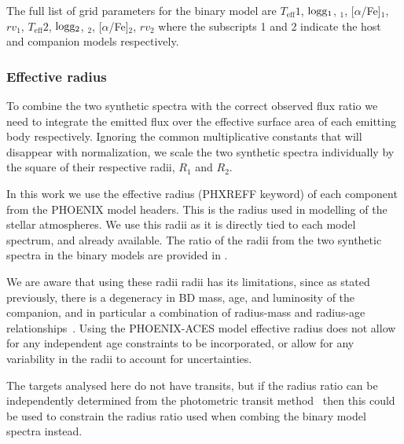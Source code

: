 {\rd{} The full list of grid parameters for the binary model are \(T_{\textrm{eff}}1\),  \(\rm logg_1\), \feh{}\(_1\), [\(\alpha\)/Fe]\(_1\), \({rv}_1\), \(T_{\textrm{eff}}2\), \(\rm logg_2\), \feh{}\(_2\), [\(\alpha\)/Fe]\(_2\), \({rv}_2\) where the subscripts 1 and 2 indicate the host and companion models respectively.}






\subsubsection{Effective radius}
\label{subsection-radius}

To combine the two synthetic spectra with the correct observed flux ratio we need to integrate the emitted flux over the effective surface area of each emitting body respectively. Ignoring the common multiplicative constants that will disappear with normalization, we scale the two synthetic spectra individually by the square of their respective radii, \(R_1\) and \(R_2\).

In this work we use the effective radius (PHXREFF keyword) of each component from the PHOENIX model headers. This is the radius used in modelling of the stellar atmospheres. We use this radii as it is directly tied to each model spectrum, and already available. The ratio of the radii from the two synthetic spectra in the binary models are provided in .

We are aware that using these radii radii has its limitations, since as stated previously, there is a degeneracy in BD mass, age, and luminosity of the companion, and in particular a combination of radius-mass and radius-age relationships~\citep{sorahana_radii_2013}. Using the {PHOENIX-ACES} model effective radius does not allow for any independent age constraints to be incorporated, or allow for any variability in the radii to account for uncertainties.

The targets analysed here do not have transits, but if the radius ratio can be independently determined from the photometric transit method~\citep{deeg_photometric_1998} then this could be used to constrain the radius ratio used when combing the binary model spectra instead.


